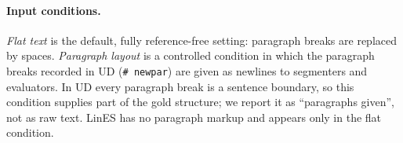 \begin{table}[t]
  \centering
  \small
  \setlength{\tabcolsep}{3.2pt}
  \caption{Corpora. Bound.: gold sentence boundaries inside documents; No punct.: share of them whose preceding word does
  not end in terminal punctuation (titles, list items, dashes, missing periods). EWT test and dev contain 33 and 42
  single-sentence documents. Status of the final evaluator's numbers: D development (leave-one-genre-out), R re-used test,
  T pre-registered one-shot test. LinES has no genre labels and is resampled as one stratum.}
  \label{tab:data}
\end{table}

\paragraph{Input conditions.} \emph{Flat text} is the default, fully reference-free setting: paragraph breaks are
replaced by spaces. \emph{Paragraph layout} is a controlled condition in which the paragraph breaks recorded in UD
(\texttt{\# newpar}) are given as newlines to segmenters and evaluators. In UD every paragraph break is a sentence
boundary, so this condition supplies part of the gold structure; we report it as ``paragraphs given'', not as raw text.
LinES has no paragraph markup and appears only in the flat condition.

